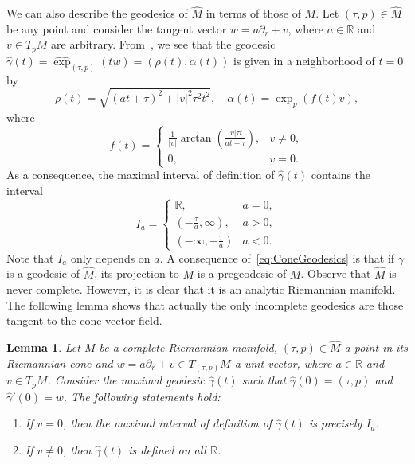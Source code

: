 \documentclass[11pt,a4paper,final]{amsart}
\newcommand{\R}{\mathbb{R}}
\renewcommand{\hat}{\widehat}
\newtheorem{lemma}[theorem]{Lemma}
\theoremstyle{definition}
\begin{document}
We can also describe the geodesics of $\hat{M}$ in terms of those of $M$.
Let $(\tau,p)\in\hat{M}$ be any point and consider the tangent vector $w=a\partial_{r}+v$, where $a\in\R$ and $v\in T_{p} M$ are arbitrary.
From~\cite[Equation~2.7]{Leistner}, we see that the geodesic $\hat{\gamma}(t)=\hat{\exp}_{(\tau,p)}(tw)=(\rho(t),\alpha(t))$ is given in a neighborhood of $t=0$ by
\begin{equation}\label{eq:ConeGeodesics}
	\rho(t)={} \sqrt{(at+\tau)^{2}+\lvert v \rvert^{2}\tau^{2}t^{2}},\quad
	\alpha(t)={}\exp_{p}(f(t)v),
\end{equation}
where
\[
	f(t)=\begin{cases}
		\frac{1}{\lvert v \rvert}\arctan\left(\frac{\lvert v \rvert \tau t}{at+\tau}\right), & v\neq0, \\
		0, & v=0.
		\end{cases}
\]
As a consequence, the maximal interval of definition of $\hat{\gamma}(t)$ contains the interval
\begin{equation}\label{eq:ConeGeodesicMaximalInterval}
	I_{a}=\begin{cases}
		\R, & a=0, \\
		\left(-\frac{\tau}{a},\infty \right), & a>0, \\
		\left(-\infty,-\frac{\tau}{a} \right) & a<0.
	\end{cases}
\end{equation}
Note that $I_{a}$ only depends on $a$.
A consequence of~\eqref{eq:ConeGeodesics} is that if $\gamma$ is a geodesic of $\hat{M}$, its projection to $M$ is a pregeodesic of $M$.
Observe that $\hat{M}$ is never complete.
However, it is clear that it is an analytic Riemannian manifold. The following lemma shows that actually the only incomplete geodesics are those tangent to the cone vector field.
\begin{lemma}\label{lemma:ConeGeodesicsIntervalOfDefinition}
	Let $M$ be a complete Riemannian manifold, $(\tau,p)\in\hat{M}$ a point in its Riemannian cone and $w=a\partial_{r}+v\in T_{(\tau,p)}M$ a unit vector, where $a\in \R$ and $v\in T_{p}M$.
	Consider the maximal geodesic $\hat{\gamma}(t)$ such that $\hat{\gamma}(0)=(\tau,p)$ and $\hat{\gamma}'(0)=w$.
	The following statements hold:
	\begin{enumerate}[\rm (i)]
		\item\label{lemmaItem:VerticalGeodesic} If $v=0$, then the maximal interval of definition of $\hat{\gamma}(t)$ is precisely $I_{a}$.
		\item\label{lemmaItem:BaseGeodesic} If $v\neq 0$, then $\hat{\gamma}(t)$ is defined on all $\R$.
	\end{enumerate}
\end{lemma}
\end{document}
